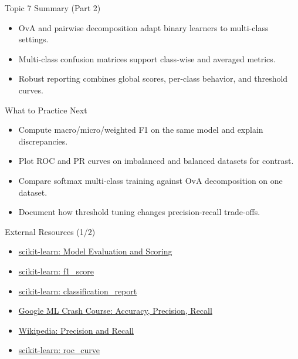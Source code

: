 \documentclass[10pt]{beamer}
\begin{document}
\begin{frame}{Topic 7 Summary (Part 2)}
  \justifying
  \begin{itemize}
    \item OvA and pairwise decomposition adapt binary learners to multi-class settings.
    \item Multi-class confusion matrices support class-wise and averaged metrics.
    \item Robust reporting combines global scores, per-class behavior, and threshold curves.
  \end{itemize}
\end{frame}

\begin{frame}{What to Practice Next}
  \justifying
  \begin{itemize}
    \item Compute macro/micro/weighted F1 on the same model and explain discrepancies.
    \item Plot ROC and PR curves on imbalanced and balanced datasets for contrast.
    \item Compare softmax multi-class training against OvA decomposition on one dataset.
    \item Document how threshold tuning changes precision-recall trade-offs.
  \end{itemize}
\end{frame}

\begin{frame}{External Resources (1/2)}
  \justifying
  \footnotesize
  \begin{itemize}
    \item \href{https://scikit-learn.org/stable/modules/model_evaluation.html}{scikit-learn: Model Evaluation and Scoring}
    \item \href{https://scikit-learn.org/stable/modules/generated/sklearn.metrics.f1_score.html}{scikit-learn: f1\_score}
    \item \href{https://scikit-learn.org/stable/modules/generated/sklearn.metrics.classification_report.html}{scikit-learn: classification\_report}
    \item \href{https://developers.google.com/machine-learning/crash-course/classification/accuracy-precision-recall}{Google ML Crash Course: Accuracy, Precision, Recall}
    \item \href{https://en.wikipedia.org/wiki/Precision_and_recall}{Wikipedia: Precision and Recall}
    \item \href{https://scikit-learn.org/stable/modules/generated/sklearn.metrics.roc_curve.html}{scikit-learn: roc\_curve}
  \end{itemize}
\end{frame}
\end{document}
